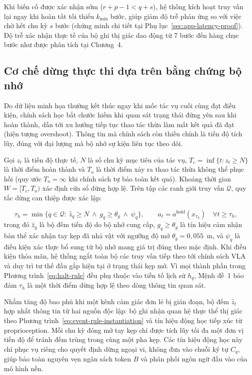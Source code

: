 Khi biến cố được xác nhận sớm ($r + p - 1 < q + s$), hệ thống kích hoạt truy vấn lại ngay khi hoàn tất tối thiểu $k_{\min}$ bước, giúp giảm độ trễ phản ứng so với việc chờ hết chu kỳ $s$ bước (chứng minh chi tiết tại Phụ lục~\ref{sec:app-latency-proof}). Độ trễ xác nhận thực tế của bộ ghi thị giác dao động từ 7 bước đến hàng chục bước như được phân tích tại Chương~4.

\subsection{Cơ chế dừng thực thi dựa trên bằng chứng bộ nhớ}

Do dữ liệu minh họa thường kết thúc ngay khi mốc tác vụ cuối cùng đạt điều kiện, chính sách học bắt chước hiếm khi quan sát trạng thái đứng yên sau khi hoàn thành, dẫn tới xu hướng tiếp tục thao tác thừa làm mất kết quả đã đạt (hiện tượng overshoot). Thông tin mà chính sách còn thiếu chính là tiến độ tích lũy, đúng với đại lượng mà bộ nhớ sự kiện liên tục theo dõi.

Gọi $z_t$ là tiến độ thực tế, $N$ là số chu kỳ mục tiêu của tác vụ, $T_c = \inf\{t: z_t \ge N\}$ là thời điểm hoàn thành và $T_o$ là thời điểm xảy ra thao tác thừa không thể phục hồi (quy ước $T_o = \infty$ khi chính sách tự bảo toàn kết quả). Khoảng thời gian $W = [T_c, T_o)$ xác định cửa sổ dừng hợp lệ. Trên tập các ranh giới truy vấn $\mathcal Q$, quy tắc dừng can thiệp được xác lập:

\begin{equation}
\tau_h = \min\{q \in \mathcal Q:\ \hat z_q \ge N\ \land\ g_q \ge \theta_g\ \land\ \psi_q\},\qquad a_t = a^{\mathrm{hold}}(x_{\tau_h})\quad \forall t \ge \tau_h,
\label{eq:halt-rule}
\end{equation}
trong đó $\hat z_q$ là bộ đếm tiến độ do bộ nhớ cung cấp, $g_q \ge \theta_g$ là tín hiệu cảm nhận bản thể xác nhận tay kẹp đã nhả vật với ngưỡng độ mở $\theta_g = 0{,}055$~m, và $\psi_q$ là điều kiện xác thực bổ sung từ bộ nhớ mang giá trị đúng theo mặc định. Khi điều kiện thỏa mãn, hệ thống ngắt toàn bộ các truy vấn tiếp theo tới chính sách VLA và duy trì tư thế đầu gắp hiện tại ở trạng thái kẹp mở. Vì mọi thành phần trong Phương trình~\eqref{eq:halt-rule} đều phụ thuộc vào tiền tố lịch sử $h_q$, Mệnh đề~1 bảo đảm $\tau_h$ là một thời điểm dừng hợp lệ theo dòng thông tin quan sát.

Nhằm tăng độ bao phủ khi một kênh cảm giác đơn lẻ bị gián đoạn, bộ đếm $\hat z_t$ hợp nhất thông tin từ hai nguồn độc lập: bộ ghi nhận quan hệ thực thể thị giác theo Phương trình~\eqref{eq:event-rule-instantiation} và tín hiệu động học tiếp xúc từ proprioception. Mỗi chu kỳ đóng mở tay kẹp chỉ được tích lũy tối đa một đơn vị tiến độ để tránh đếm trùng trong cùng một pha kẹp. Các tín hiệu động học này chỉ phục vụ riêng cho quyết định dừng ngoại vi, không đưa vào chuỗi ký tự $C_q$, giúp bảo toàn nguyên vẹn ngân sách token $B$ và phân phối ngôn ngữ đầu vào của mô hình nền.

